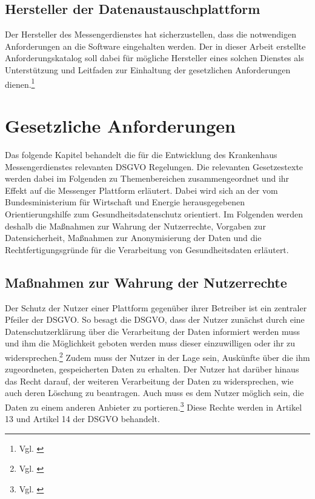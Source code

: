 \subsection{Hersteller der Datenaustauschplattform}\label{subsection:hdd}
Der Hersteller des Messengerdienstes hat sicherzustellen, dass die notwendigen Anforderungen an die Software eingehalten werden.
Der in dieser Arbeit erstellte Anforderungskatalog soll dabei für mögliche Hersteller eines solchen Dienstes als Unterstützung und Leitfaden zur Einhaltung der gesetzlichen Anforderungen dienen.\footnote{Vgl. \cite[S. 13]{Bundesverband-Gesundheits-IT-e.V.2016}}

\section{Gesetzliche Anforderungen}\label{section:dsgvo}
Das folgende Kapitel behandelt die für die Entwicklung des Krankenhaus Messengerdienstes relevanten DSGVO Regelungen. Die relevanten Gesetzestexte werden dabei im Folgenden zu Themenbereichen zusammengeordnet und ihr Effekt auf die Messenger Plattform erläutert. Dabei wird sich an der vom Bundesministerium für Wirtschaft und Energie herausgegebenen Orientierungshilfe zum Gesundheitsdatenschutz orientiert. Im Folgenden werden deshalb die Maßnahmen zur Wahrung der Nutzerrechte, Vorgaben zur Datensicherheit, Maßnahmen zur Anonymisierung der Daten und die Rechtfertigungsgründe für die Verarbeitung von Gesundheitsdaten erläutert.

\subsection{Maßnahmen zur Wahrung der Nutzerrechte}\label{subsection:mzwdn}
Der Schutz der Nutzer einer Plattform gegenüber ihrer Betreiber ist ein zentraler Pfeiler der DSGVO. So besagt die DSGVO, dass der Nutzer zunächst durch eine Datenschutzerklärung über die Verarbeitung der Daten informiert werden muss und ihm die Möglichkeit geboten werden muss dieser einzuwilligen oder ihr zu widersprechen.\footnote{Vgl. \cite[S. 3]{Bundesaerztekammer2020}} Zudem muss der Nutzer in der Lage sein, Auskünfte über die ihm zugeordneten, gespeicherten Daten zu erhalten. Der Nutzer hat darüber hinaus das Recht darauf, der weiteren Verarbeitung der Daten zu widersprechen, wie auch deren Löschung zu beantragen. Auch muss es dem Nutzer möglich sein, die Daten zu einem anderen Anbieter zu portieren.\footnote{Vgl. \cite[S. 30 ff.]{Bundesaerztekammer2020}} Diese Rechte werden in Artikel 13 und Artikel 14 der DSGVO behandelt.

